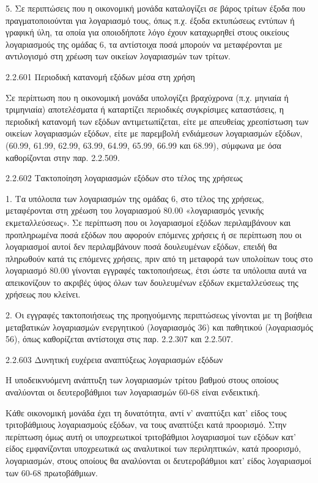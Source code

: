\documentclass[A4,10pt,greek]{book}
\begin{document}
5. Σε περιπτώσεις που η οικονομική μονάδα καταλογίζει σε βάρος τρίτων έξοδα που πραγματοποιούνται για λογαριασμό τους, όπως π.χ. έξοδα εκτυπώσεως εντύπων ή γραφική ύλη, τα οποία για οποιοδήποτε λόγο έχουν καταχωρηθεί στους οικείους λογαριασμούς της ομάδας 6, τα αντίστοιχα ποσά μπορούν να μεταφέρονται με αντιλογισμό στη χρέωση των οικείων λογαριασμών των τρίτων.

2.2.601 Περιοδική κατανομή εξόδων μέσα στη χρήση

Σε περίπτωση που η οικονομική μονάδα υπολογίζει βραχύχρονα (π.χ. μηνιαία ή τριμηνιαία) αποτελέσματα ή καταρτίζει περιοδικές συγκρίσιμες καταστάσεις, η περιοδική κατανομή των εξόδων αντιμετωπίζεται, είτε με απευθείας χρεοπίστωση των οικείων λογαριασμών εξόδων, είτε με παρεμβολή ενδιάμεσων λογαριασμών εξόδων, (60.99, 61.99, 62.99, 63.99, 64.99, 65.99, 66.99 και 68.99), σύμφωνα με όσα καθορίζονται στην παρ. 2.2.509.

2.2.602 Τακτοποίηση λογαριασμών εξόδων στο τέλος της χρήσεως

1. Τα υπόλοιπα των λογαριασμών της ομάδας 6, στο τέλος της χρήσεως, μεταφέρονται στη χρέωση του λογαριασμού 80.00 «λογαριασμός γενικής εκμεταλλεύσεως». Σε περίπτωση που οι λογαριασμοί εξόδων περιλαμβάνουν και προπληρωμένα ποσά εξόδων που αφορούν επόμενες χρήσεις ή σε περίπτωση που οι λογαριασμοί αυτοί δεν περιλαμβάνουν ποσά δουλευμένων εξόδων, επειδή θα πληρωθούν κατά τις επόμενες χρήσεις, πριν από τη μεταφορά των υπολοίπων τους στο λογαριασμό 80.00 γίνονται εγγραφές τακτοποιήσεως, έτσι ώστε τα υπόλοιπα αυτά να απεικονίζουν το ακριβές ύψος όλων των δουλευμένων εξόδων εκμεταλλεύσεως της χρήσεως που κλείνει.

2. Οι εγγραφές τακτοποιήσεως της προηγούμενης περιπτώσεως γίνονται με τη βοήθεια μεταβατικών λογαριασμών ενεργητικού (λογαριασμός 36) και παθητικού (λογαριασμός 56), όπως καθορίζεται αντίστοιχα στις παρ. 2.2.307 και 2.2.507.

2.2.603 Δυνητική ευχέρεια αναπτύξεως λογαριασμών εξόδων

Η υποδεικνυόμενη ανάπτυξη των λογαριασμών τρίτου βαθμού στους οποίους αναλύονται οι δευτεροβάθμιοι των λογαριασμών 60-68 είναι ενδεικτική.

Κάθε οικονομική μονάδα έχει τη δυνατότητα, αντί ν' αναπτύξει κατ' είδος τους τριτοβάθμιους λογαριασμούς εξόδων, να τους αναπτύξει κατά προορισμό. Στην περίπτωση όμως αυτή οι υποχρεωτικοί τριτοβάθμιοι λογαριασμοί των εξόδων κατ' είδος εμφανίζονται υποχρεωτικά ως αναλυτικοί των περιληπτικών, κατά προορισμό, λογαριασμών, στους οποίους θα αναλύονται οι δευτεροβάθμιοι κατ' είδος λογαριασμοί των 60-68 πρωτοβάθμιων.
\end{document}
